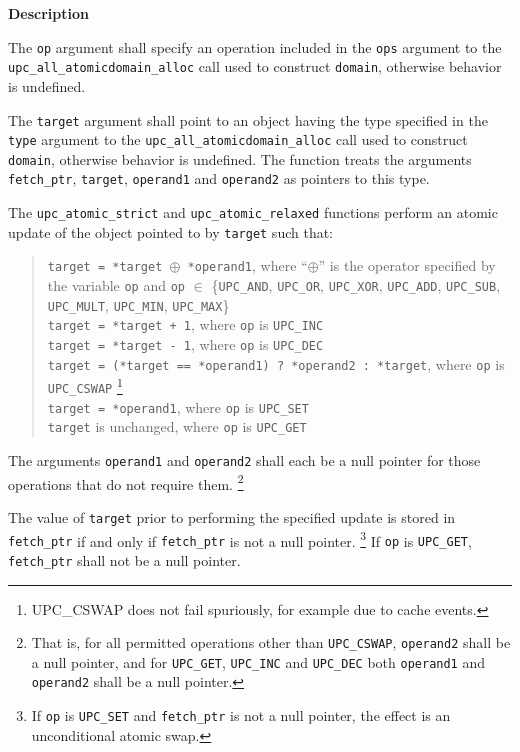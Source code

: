 {\bf Description}

\np The {\tt op} argument shall specify an operation included in the {\tt ops}
    argument to the {\tt upc\_all\_atomicdomain\_alloc} call used to construct
    {\tt domain}, otherwise behavior is undefined.

\np The {\tt target} argument shall point to an object having the type
    specified in the {\tt type} argument to the {\tt upc\_all\_atomicdomain\_alloc} 
    call used to construct {\tt domain}, otherwise behavior is undefined. 
    The function treats the arguments {\tt fetch\_ptr}, {\tt target}, 
    {\tt operand1} and {\tt operand2} as pointers to this type.

\np The {\tt upc\_atomic\_strict} and {\tt upc\_atomic\_relaxed} functions perform
    an atomic update of the object pointed to by {\tt target} such that:

    \begin{verse}
      {\tt *target = *target $\oplus$ *operand1},
        where ``$\oplus$'' is the operator specified by the variable {\tt op}
        and {\tt op} $\in$ \{{\tt UPC\_AND}, {\tt UPC\_OR}, {\tt UPC\_XOR},
        {\tt UPC\_ADD}, {\tt UPC\_SUB}, {\tt UPC\_MULT}, {\tt UPC\_MIN}, {\tt UPC\_MAX}\} \\
      {\tt *target = *target + 1}, 
        where {\tt op} is {\tt UPC\_INC} \\
      {\tt *target = *target - 1}, 
        where {\tt op} is {\tt UPC\_DEC} \\
      {\tt *target = (*target == *operand1) ? *operand2 : *target},
        where {\tt op} is {\tt UPC\_CSWAP}%
        \footnote{UPC\_CSWAP does not fail spuriously, for example due to cache events.} \\
      {\tt *target = *operand1},
        where {\tt op} is {\tt UPC\_SET} \\
      {\tt *target} is unchanged,
        where {\tt op} is {\tt UPC\_GET} \\
    \end{verse}

\np The arguments {\tt operand1} and {\tt operand2} shall each be a null
    pointer for those operations that do not require them.%
    \footnote{That is, for all permitted operations other than {\tt UPC\_CSWAP},
    {\tt operand2} shall be a null pointer, and for {\tt UPC\_GET}, {\tt UPC\_INC} and {\tt UPC\_DEC}
    both {\tt operand1} and {\tt operand2} shall be a null pointer.}

\np The value of {\tt *target} prior to performing
    the specified update is stored in {\tt *fetch\_ptr} if and only if
    {\tt fetch\_ptr} is not a null pointer.%
    \footnote{If {\tt op} is {\tt UPC\_SET} and {\tt fetch\_ptr} is
    not a null pointer, the effect is an unconditional atomic swap.}
    If {\tt op} is {\tt UPC\_GET}, {\tt fetch\_ptr} shall not be a null pointer.

